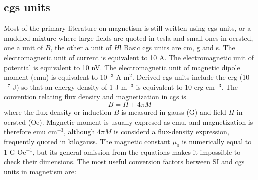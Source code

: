 \subsection{cgs units%
}
Most of the primary literature on magnetism is still written using cgs
units, or a muddled mixture where large fields are quoted in tesla and small
ones in oersted, one a unit of $B$, the other a unit of $H$! Basic cgs units
are cm, g and s. The electromagnetic unit of current is equivalent to 10 A.
The electromagnetic unit of potential is equivalent to 10 nV. The
electromagnetic unit of magnetic dipole moment (emu) is equivalent to 10$%
^{-3}$ A m$^{2}$. Derived cgs units include the erg (10$^{-7}$ J) so that an
energy density of 1 J m$^{-3}$ is equivalent to 10 erg cm$^{-3}$.
The convention relating flux density and magnetization in cgs is 
\begin{equation}
{B}={H}+4\pi {M}  
\end{equation}%
where the flux density or induction ${B}$ is measured in gauss
(G) and field ${H}$ in oersted (Oe). Magnetic moment is usually
expresed as emu, and magnetization is therefore emu cm$^{-3}$, although $%
4\pi {M}$ is considerd a flux-density expression, frequently
quoted in kilogauss. The magnetic constant $%
{\mu}%
_{0}$ is numerically equal to 1 G Oe$^{-1}$, but its general omission from
the equations makes it impossible to check their dimensions.
The most useful conversion factors between SI and cgs units in magnetism are:
